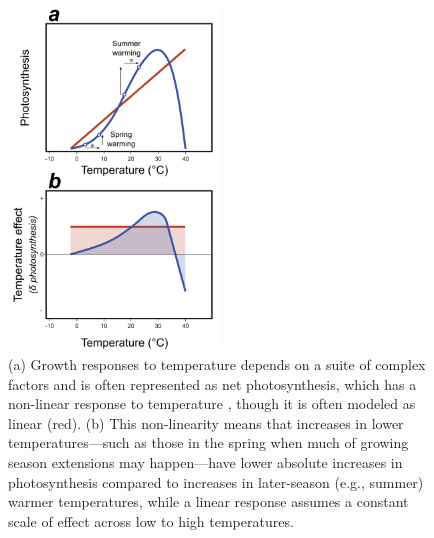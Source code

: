 \documentclass[11pt]{article}
\begin{document}
\clearpage
\begin{figure}[h!]
\includegraphics[width=0.5\textwidth]{..//figures/_figuresFromRuben/Tempresponses.png} %
\caption{(a) Growth responses to temperature depends on a suite of complex factors and is often represented as net photosynthesis, which has a non-linear response to temperature  \citep[blue curve, adapated from meta-analysis of][]{rezende2019thermal}, though it is often modeled as linear (red). (b) This non-linearity means that increases in lower temperatures---such as those in the spring when much of growing season extensions may happen---have lower absolute increases in photosynthesis compared to increases in later-season (e.g., summer) warmer temperatures, while a linear response assumes a constant scale of effect across low to high temperatures.}
\label{fig:temperaturecomplex}
\end{figure}
\end{document}
